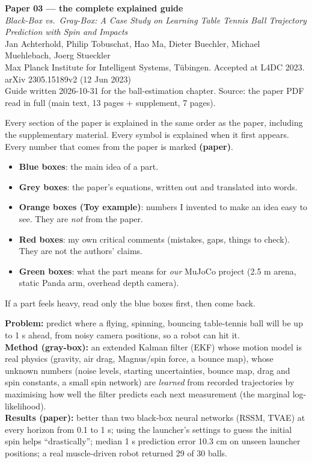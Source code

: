 \documentclass[11pt,a4paper]{article}
\begin{document}
\setcounter{tocdepth}{2}

\begin{center}
{\LARGE\bfseries\color{cblue} Paper 03 --- the complete explained guide}\\[0.6em]
{\large \textit{Black-Box vs.\ Gray-Box: A Case Study on Learning Table Tennis Ball Trajectory Prediction with Spin and Impacts}}\\[0.5em]
Jan Achterhold, Philip Tobuschat, Hao Ma, Dieter Buechler, Michael Muehlebach, Joerg Stueckler\\
Max Planck Institute for Intelligent Systems, T\"ubingen. Accepted at L4DC 2023. arXiv 2305.15189v2 (12 Jun 2023)\\[0.4em]
{\small Guide written 2026-10-31 for the ball-estimation chapter. Source: the paper PDF read in full (main text, 13 pages + supplement, 7 pages).}
\end{center}

\begin{idea}
Every section of the paper is explained in the same order as the paper, including the supplementary material.
Every symbol is explained when it first appears. Every number that comes from the paper is marked \textbf{(paper)}.
\begin{itemize}
\item \textbf{Blue boxes}: the main idea of a part.
\item \textbf{Grey boxes}: the paper's equations, written out and translated into words.
\item \textbf{Orange boxes (Toy example)}: numbers I invented to make an idea easy to see. They are \emph{not} from the paper.
\item \textbf{Red boxes}: my own critical comments (mistakes, gaps, things to check). They are not the authors' claims.
\item \textbf{Green boxes}: what the part means for \emph{our} MuJoCo project (2.5 m arena, static Panda arm, overhead depth camera).
\end{itemize}
If a part feels heavy, read only the blue boxes first, then come back.
\end{idea}

\begin{eqbox}
\textbf{Problem:} predict where a flying, spinning, bouncing table-tennis ball will be up to 1 s ahead, from noisy camera positions, so a robot can hit it.\\
\textbf{Method (gray-box):} an extended Kalman filter (EKF) whose motion model is real physics (gravity, air drag, Magnus/spin force, a bounce map),
whose unknown numbers (noise levels, starting uncertainties, bounce map, drag and spin constants, a small spin network) are \emph{learned} from recorded trajectories
by maximising how well the filter predicts each next measurement (the marginal log-likelihood).\\
\textbf{Results (paper):} better than two black-box neural networks (RSSM, TVAE) at every horizon from 0.1 to 1 s; using the launcher's settings to guess the initial spin
helps ``drastically''; median 1 s prediction error 10.3 cm on unseen launcher positions; a real muscle-driven robot returned 29 of 30 balls.
\end{eqbox}
\end{document}
